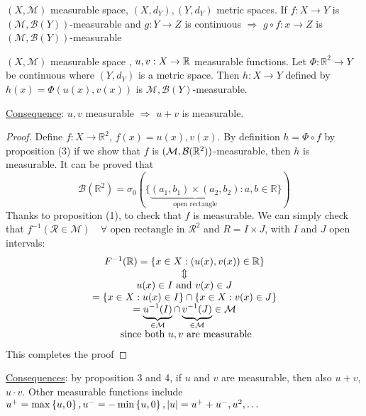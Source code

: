 \begin{proposition}
    \((X, \mathcal{M})\) measurable space, \((X, d_Y), (Y, d_Y)\) metric spaces. 
    If \(f: X \to Y\) is \((\mathcal{M}, \mathcal{B}(Y))\)-measurable and \(g : Y \to Z\) is continuous \(\Longrightarrow\) \(g \circ f : x \to Z\) is \((\mathcal{M}, \mathcal{B}(Y))\)-measurable
\end{proposition}
\begin{proposition}
    \((X, \mathcal{M})\) measurable space , \(u,v : X \to  \mathbb{R}\) measurable functions.
    Let \(\Phi : \mathbb{R}^2 \to Y\) be continuous where \((Y, d_Y)\) is a metric space. Then \(h: X\to Y\) defined by \(h(x) = \Phi(u(x), v(x))\) is \(\mathcal{M}, \mathcal{B}(Y)\)-measurable.
\end{proposition}
\underline{Consequence}: \(u, v\) measurable \(\Rightarrow\) \(u+v\) is measurable.
\begin{proof}
    Define \(f: X \to \mathbb{R}^2\), \(f(x) = u(x), v(x)\). By definition \(h = \Phi \circ f\) by proposition (3) if we show that \(f\) is \((\mathcal{M},\mathcal{B}(\mathbb{R}^2))\)-measurable, then \(h\) is measurable. It can be proved that \[\mathcal{B}(\mathbb{R}^2) = \sigma_0 (\lbrace \underbrace{(a_1, b_1) \times (a_2, b_2)}_{\mbox{open rectangle}}: a,b \in \mathbb{R}\rbrace)\]
    Thanks to proposition (1), to check that \(f\) is measurable. We can simply check that
    \(f^{-1}(\mathcal{R} \in \mathcal{M}) \quad \forall \mbox{ open rectangle in }\mathcal{R}^2\) and
    \(R = I \times J\), with \(I\) and \(J\) open intervals:
    \[
        \begin{array}{c}
            F^{-1}(\mathbb{R}) = \left\lbrace x \in X : (u(x), v(x)) \in \mathbb{R} \right\rbrace \\
            \Updownarrow \\
            u(x) \in I \mbox{ and } v(x) \in J \\
            = \left\{ x \in X : u(x) \in I \right\} \cap \left\{ x \in X : v(x) \in J \right\} \\
            = \underbrace{u^{-1}(I)}_{\in \mathcal{M}} \cap \underbrace{v^{-1}(J)}_{\in \mathcal{M}} \in \mathcal{M} \\
            \mbox{ since both }u,v \mbox{ are measurable}
        \end{array}
    \]
    This completes the proof
\end{proof}
\underline{Consequences}: by proposition 3 and 4, if \(u\) and \(v\) are measurable, then also \(u+v\), \(u \cdot v\). Other measurable functions include \(u^+ = \max\left\{ u, 0 \right\}, u^- =- \min\left\{u,0\right\}, \lvert u\rvert = u^+ + u^-, u^2, \ldots\)

